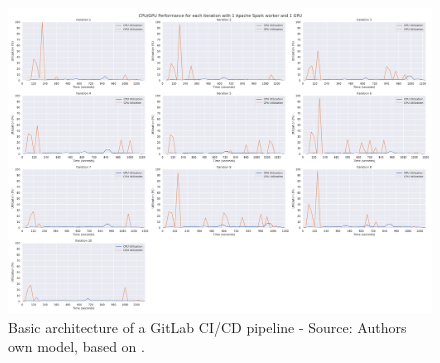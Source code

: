 \begin{figure}[h]
\centering
\includegraphics[scale=0.2]{images/07_evaluation/gpu1_performance}
\caption{Basic architecture of a GitLab CI/CD pipeline - Source: Authors own model, based on \cite{Gitlab2020Docs}.}
\label{fig:04_gitlab_pipeline_basic_arch}
\end{figure}
